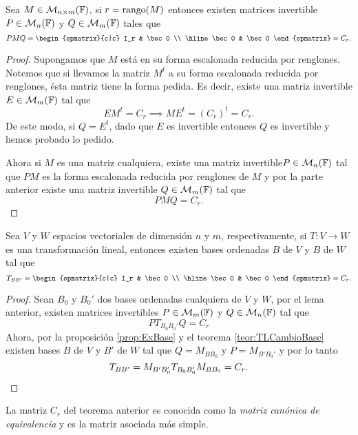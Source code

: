 \begin{lema}
  Sea $M \in \mathcal{M}_{n\times m}(\mathbb{F})$, si $r = \operatorname{rango}(M)$ entonces existen matrices invertible $P \in \mathcal{M}_n(\mathbb{F})$ y $Q \in \mathcal{M}_m(\mathbb{F})$ tales que
  \[ PMQ = \begin{spmatrix}{c|c}
    I_r & \bec 0 \\ \hline
    \bec 0 & \bec 0
  \end{spmatrix} = C_r.\]
\end{lema}
\begin{proof}
  Supongamos que $M$ está en su forma escalonada reducida por renglones. Notemos que si llevamos la matriz $M^t$ a su forma escalonada reducida por renglones, ésta matriz tiene la forma pedida. Es decir, existe una matriz invertible $E \in \mathcal{M}_m(\mathbb{F})$ tal que 
  \[
    EM^t = C_r \implies ME^t = (C_r)^t = C_r.
  \]
  De este modo, si $Q = E^t$, dado que $E$ es invertible entonces $Q$ es invertible y hemos probado lo pedido.

  Ahora si $M$ es una matriz cualquiera, existe una matriz invertible$P\in\mathcal{M}_n(\mathbb{F})$ tal que $PM$ es la forma escalonada reducida por renglones de $M$ y por la parte anterior existe una matriz invertible $Q \in \mathcal{M}_m(\mathbb{F})$ tal que
    \[
      PMQ = C_r.
    \]
\end{proof}

\begin{teor}
  Sea $V$ y $W$ espacios vectoriales de dimensión $n$ y $m$, respectivamente, si $T \colon V \to W$ es una transformación lineal, entonces existen bases ordenadas $B$ de $V$ y $B$ de $W$ tal que
  \[
    T_{BB'} =  \begin{spmatrix}{c|c}
      I_r & \bec 0 \\ \hline
      \bec 0 & \bec 0
    \end{spmatrix} = C_r.
  \]
\end{teor}

\begin{proof}
  Sean $B_0$ y $B_0'$ dos bases ordenadas cualquiera de $V$ y $W$, por el lema anterior, existen matrices invertibles $P \in \mathcal{M}_m(\mathbb{F})$ y $Q \in \mathcal{M}_n(\mathbb{F})$ tal que
    \[
      PT_{B_0B_0'} Q = C_r
    \]
  Ahora, por la proposición \ref{prop:ExBase} y el teorema \ref{teor:TLCambioBase} existen bases $B$ de $V$ y $B'$ de $W$ tal que $Q = M_{BB_0}$ y $P = M_{B'B_0'}$ y por lo tanto
  \[
    T_{BB'} = M_{B'B_0'} T_{B_0B_0'} M_{BB_0} = C_r. \qedhere
  \]
\end{proof}

La matriz $C_r$ del teorema anterior es conocida como la \emph{matriz canónica de equivalencia} y es la matriz asociada más simple.

